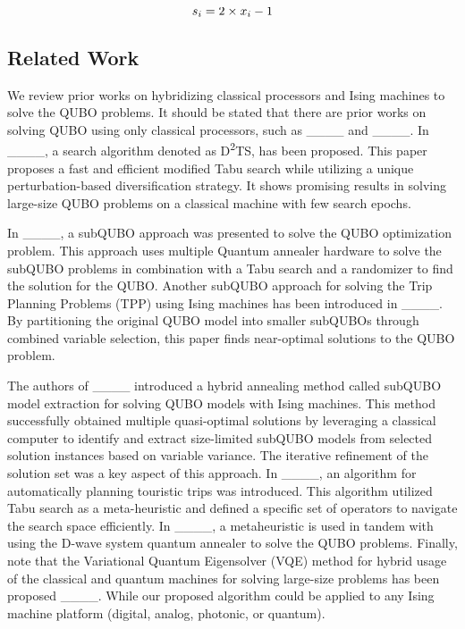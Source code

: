 \vspace{-8pt}

\begin{equation}
\label{eq:3}
\small
s_i = 2 \times x_i - 1
\end{equation}

\vspace{-10pt}
\subsection{Related Work}
We review prior works on hybridizing classical processors and Ising machines to solve the QUBO problems. 
It should be stated that there are prior works on solving QUBO using only classical processors, such as ____ and ____. 
In ____, a search algorithm denoted as D\textsuperscript{2}TS, has been proposed. This paper proposes a fast and efficient modified Tabu search while utilizing a unique perturbation-based diversification strategy. It shows promising results in solving large-size QUBO problems on a classical machine with few search epochs.

In ____, a subQUBO approach was presented to solve the QUBO optimization problem. This approach uses multiple Quantum annealer hardware to solve the subQUBO problems in combination with a Tabu search and a randomizer to find the solution for the QUBO. 
Another subQUBO approach for solving the Trip Planning Problems (TPP) using Ising machines has been introduced in ____. By partitioning the original QUBO model into smaller subQUBOs through combined variable selection, this paper finds near-optimal solutions to the QUBO problem. 

The authors of ____ introduced a hybrid annealing method called subQUBO model extraction for solving QUBO models with Ising machines. This method successfully obtained multiple quasi-optimal solutions by leveraging a classical computer to identify and extract size-limited subQUBO models from selected solution instances based on variable variance. The iterative refinement of the solution set was a key aspect of this approach.
In ____, an algorithm for automatically planning touristic trips was introduced. This algorithm utilized Tabu search as a meta-heuristic and defined a specific set of operators to navigate the search space efficiently.
In ____, a metaheuristic is used in tandem with using the D-wave system quantum annealer to solve the QUBO problems. Finally, note that the Variational Quantum Eigensolver (VQE) method for hybrid usage of the classical and quantum machines for solving large-size problems has been proposed ____. While our proposed algorithm could be applied to any Ising machine platform (digital, analog, photonic, or quantum).


